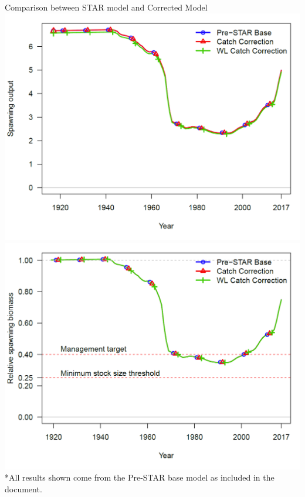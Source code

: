 \documentclass[pdf]{beamer}\usepackage[]{graphicx}\usepackage[]{color}
\begin{document}
\begin{frame}{Comparison between STAR model and Corrected Model}
  \includegraphics[scale = 0.20]{figures/12_0_vs_13_0_ssb.png}
  \includegraphics[scale = 0.20]{figures/12_0_vs_13_0_dep.png}
  \\
  *All results shown come from the Pre-STAR base model as included in the document.
\end{frame}
\end{document}

